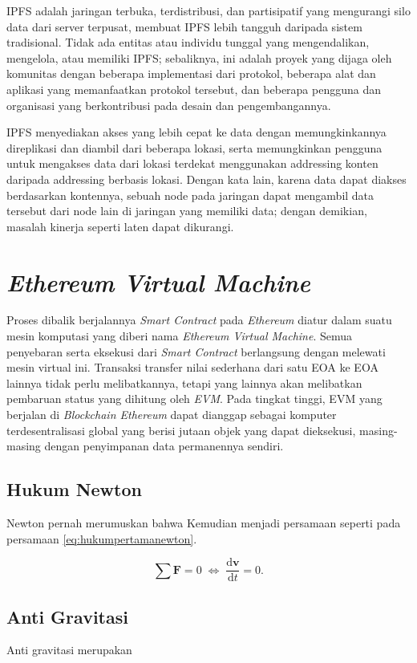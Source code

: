 IPFS adalah jaringan terbuka, terdistribusi, dan partisipatif yang mengurangi silo data dari server terpusat, membuat 
IPFS lebih tangguh daripada sistem tradisional. Tidak ada entitas atau individu tunggal yang mengendalikan, mengelola, 
atau memiliki IPFS; sebaliknya, ini adalah proyek yang dijaga oleh komunitas dengan beberapa implementasi dari protokol, 
beberapa alat dan aplikasi yang memanfaatkan protokol tersebut, dan beberapa pengguna dan organisasi yang berkontribusi 
pada desain dan pengembangannya.

IPFS menyediakan akses yang lebih cepat ke data dengan memungkinkannya direplikasi dan diambil dari beberapa lokasi, 
serta memungkinkan pengguna untuk mengakses data dari lokasi terdekat menggunakan addressing konten daripada addressing berbasis lokasi. 
Dengan kata lain, karena data dapat diakses berdasarkan kontennya, sebuah node pada jaringan dapat mengambil data tersebut dari node lain 
di jaringan yang memiliki data; dengan demikian, masalah kinerja seperti laten dapat dikurangi.

\section{\emph{Ethereum Virtual Machine}}

Proses dibalik berjalannya \emph{Smart Contract} pada \emph{Ethereum} diatur dalam suatu mesin komputasi yang diberi nama
\emph{Ethereum Virtual Machine}. Semua penyebaran serta eksekusi dari \emph{Smart Contract} berlangsung dengan melewati mesin virtual ini.
Transaksi transfer nilai sederhana dari satu EOA ke EOA lainnya tidak perlu melibatkannya, tetapi yang lainnya akan melibatkan pembaruan status yang dihitung oleh \emph{EVM}.
Pada tingkat tinggi, EVM yang berjalan di \emph{Blockchain Ethereum} dapat dianggap sebagai komputer terdesentralisasi global yang berisi jutaan objek yang dapat dieksekusi,
masing-masing dengan penyimpanan data permanennya sendiri.

\subsection{Hukum Newton}
\label{subsec:hukumnewton}

Newton \parencite{newton1687} pernah merumuskan bahwa \lipsum[1]
Kemudian menjadi persamaan seperti pada persamaan \ref{eq:hukumpertamanewton}.

\begin{equation}
  \label{eq:hukumpertamanewton}
  \sum \mathbf{F} = 0\; \Leftrightarrow\; \frac{\mathrm{d} \mathbf{v} }{\mathrm{d}t} = 0.
\end{equation}

\subsection{Anti Gravitasi}
\label{subsec:antigravitasi}

Anti gravitasi merupakan \lipsum[1]

